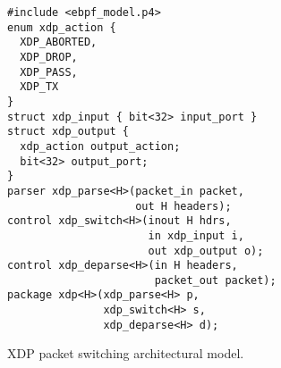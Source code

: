 \begin{figure}
\begin{lstlisting}
#include <ebpf_model.p4>
enum xdp_action {
  XDP_ABORTED,
  XDP_DROP,
  XDP_PASS,
  XDP_TX
}
struct xdp_input { bit<32> input_port }
struct xdp_output {
  xdp_action output_action;
  bit<32> output_port;
}
parser xdp_parse<H>(packet_in packet,
                    out H headers);
control xdp_switch<H>(inout H hdrs,
                      in xdp_input i,
                      out xdp_output o);
control xdp_deparse<H>(in H headers,
                       packet_out packet);
package xdp<H>(xdp_parse<H> p,
               xdp_switch<H> s,
               xdp_deparse<H> d);
\end{lstlisting}
\caption{XDP packet switching architectural
  model.}\label{fig:xdp-model}
\end{figure}

